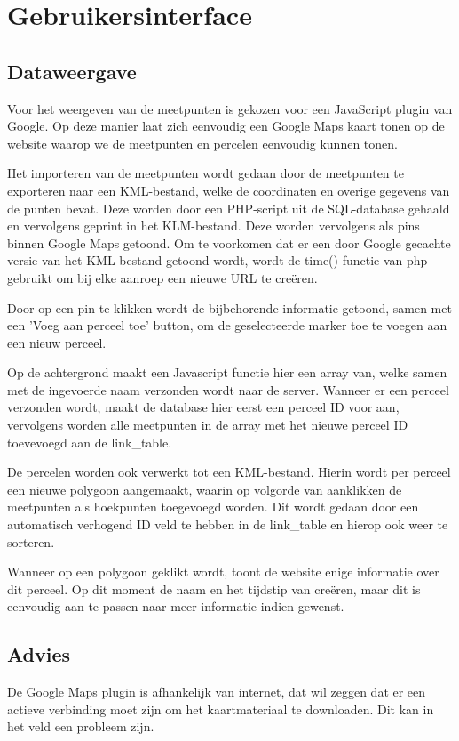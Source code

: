 \section{Gebruikersinterface}
\subsection{Dataweergave}
Voor het weergeven van de meetpunten is gekozen voor een JavaScript plugin van Google.
Op deze manier laat zich eenvoudig een Google Maps kaart tonen op de website waarop we de
meetpunten en percelen eenvoudig kunnen tonen.

Het importeren van de meetpunten wordt gedaan door de meetpunten te exporteren naar een
KML-bestand, welke de coordinaten en overige gegevens van de punten bevat. Deze worden
door een PHP-script uit de SQL-database gehaald en vervolgens geprint in het KLM-bestand.
Deze worden vervolgens als pins binnen Google Maps getoond. Om te voorkomen dat er een
door Google gecachte versie van het KML-bestand getoond wordt, wordt de time() functie van
php gebruikt om bij elke aanroep een nieuwe URL te creëren.

Door op een pin te klikken wordt de bijbehorende informatie getoond, samen met een 'Voeg
aan perceel toe' button, om de geselecteerde marker toe te voegen aan een nieuw perceel.

Op de achtergrond maakt een Javascript functie hier een array van, welke samen met de
ingevoerde naam verzonden wordt naar de server.
Wanneer er een perceel verzonden wordt, maakt de database hier eerst een perceel ID voor
aan, vervolgens worden alle meetpunten in de array met het nieuwe perceel ID toevevoegd
aan de link\_table.

De percelen worden ook verwerkt tot een KML-bestand. Hierin wordt per perceel een nieuwe
polygoon aangemaakt, waarin op volgorde van aanklikken de meetpunten als hoekpunten
toegevoegd worden. Dit wordt gedaan door een automatisch verhogend ID veld te hebben in de
link\_table en hierop ook weer te sorteren.

Wanneer op een polygoon geklikt wordt, toont de website enige informatie over dit perceel.
Op dit moment de naam en het tijdstip van creëren, maar dit is eenvoudig aan te passen naar
meer informatie indien gewenst.


\subsection{Advies}
De Google Maps plugin is afhankelijk van internet, dat wil zeggen dat er een actieve
verbinding moet zijn om het kaartmateriaal te downloaden. Dit kan in het veld een
probleem zijn.
